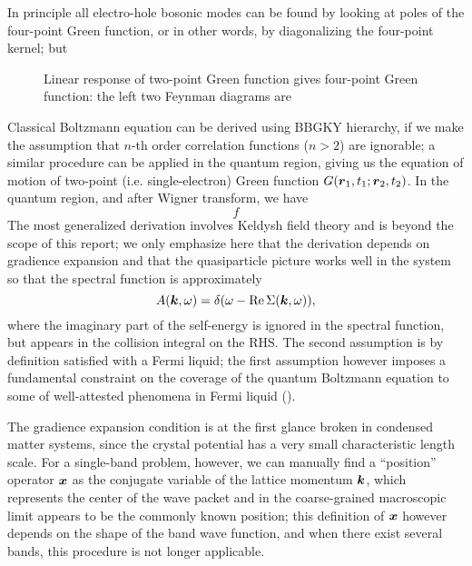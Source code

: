 \documentclass[hyperref, a4paper]{article}
\begin{document}
In principle all electro-hole bosonic modes can be found by 
looking at poles of the four-point Green function,
or in other words, 
by diagonalizing the four-point kernel;
but 

\begin{figure}
    \centering
    
    \caption{Linear response of two-point Green function gives four-point Green function: 
    the left two Feynman diagrams are }
\end{figure}

Classical Boltzmann equation can be derived using 
BBGKY hierarchy,
if we make the assumption that $n$-th order correlation functions ($n > 2$) 
are ignorable; 
a similar procedure can be applied in the quantum region, 
giving us the equation of motion 
of two-point (i.e. single-electron) Green function $G(\vb*{r}_1, t_1; \vb*{r}_2, t_2)$.
In the quantum region, 
and after Wigner transform, we have 
\begin{equation}
    f
\end{equation}
The most generalized derivation involves Keldysh field theory 
and is beyond the scope of this report; 
we only emphasize here that the derivation 
depends on gradience expansion 
and that the quasiparticle picture works well in the system 
so that the spectral function is approximately 
\begin{equation}
    A(\vb*{k}, \omega) = \delta(\omega - \Re \Sigma(\vb*{k}, \omega)),
\end{equation}
where the imaginary part of the self-energy is ignored 
in the spectral function,
but appears in the collision integral on the RHS.
The second assumption is by definition satisfied with a Fermi liquid;
the first assumption 
however imposes a fundamental constraint 
on the coverage of the quantum Boltzmann equation
to some of well-attested phenomena in Fermi liquid
(). 

The gradience expansion condition is at the first glance 
broken in condensed matter systems, 
since the crystal potential has a very small characteristic length scale.
For a single-band problem, however, 
we can manually find a ``position'' operator $\vb*{x}$ as the conjugate variable 
of the lattice momentum $\vb*{k}$,
which represents the center of the wave packet 
and in the coarse-grained macroscopic limit 
appears to be the commonly known position;
this definition of $\vb*{x}$ however depends on the 
shape of the band wave function,
and when there exist several bands, 
this procedure is not longer applicable.
\end{document}
